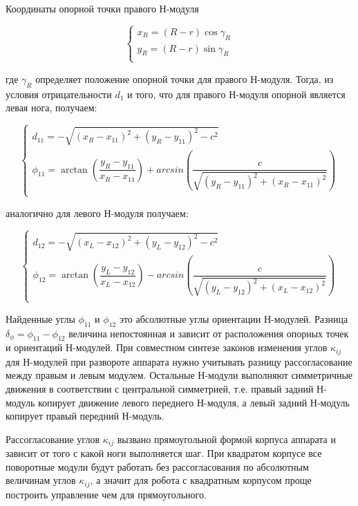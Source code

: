 Координаты опорной точки правого Н-модуля

$$
\left\{
\begin{array}{lcr}
x_R = (R-r)\cos{\gamma_R}\\
y_R = (R-r)\sin{\gamma_R}\\
\end{array}
\right.
$$

где $\gamma_R$ определяет положение опорной точки для правого Н-модуля. Тогда, из условия отрицательности $d_1$ и того, что для правого Н-модуля опорной является левая нога, получаем:

$$
\left\{
\begin{array}{lcr}
d_{11} = -\sqrt{(x_R-x_{11})^2+(y_R-y_{11})^2-c^2}\\
\phi_{11} = \arctan\left(\dfrac{y_R-y_{11}}{x_R-x_{11}}\right)+arcsin{\left(\dfrac{c}{\sqrt{(y_R-y_{11})^2+(x_R-x_{11})^2}}\right)}\\
\end{array}
\right.
$$

аналогично для левого Н-модуля получаем:

$$
\left\{
\begin{array}{lcr}
d_{12} = -\sqrt{(x_L-x_{12})^2+(y_L-y_{12})^2-c^2}\\
\phi_{12} = \arctan\left(\dfrac{y_L-y_{12}}{x_L-x_{12}}\right)-arcsin{\left(\dfrac{c}{\sqrt{(y_L-y_{12})^2+(x_L-x_{12})^2}}\right)}\\
\end{array}
\right.
$$

Найденные углы $\phi_{11}$ и $\phi_{12}$ это абсолютные углы ориентации Н-модулей. Разница $\delta_\phi = \phi_{11}-\phi_{12}$ величина непостоянная и зависит от расположения опорных точек и ориентаций Н-модулей. При совместном синтезе законов изменения углов $\kappa_{ij}$ для Н-модулей при развороте аппарата нужно учитывать разницу рассогласование между правым и левым модулем. Остальные Н-модули выполняют симметричные движения в соответствии с центральной симметрией, т.е. правый задний Н-модуль копирует движение левого переднего Н-модуля, а левый задний Н-модуль копирует правый передний Н-модуль.

Рассогласование углов $\kappa_{ij}$ вызвано прямоугольной формой корпуса аппарата и зависит от того с какой ноги выполняется шаг. При квадратом корпусе все поворотные модули будут работать без рассогласования по абсолютным величинам углов $\kappa_{ij}$, а значит для робота с квадратным корпусом проще построить управление чем для прямоугольного.

